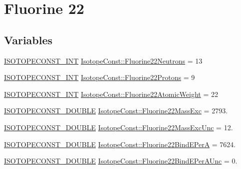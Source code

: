 \hypertarget{group___isotope_const-_fluorine-_f22}{}\section{Fluorine 22}
\label{group___isotope_const-_fluorine-_f22}
\subsection*{Variables}
\begin{DoxyCompactItemize}
\item 
\mbox{\hyperlink{group___isotope_const-_macros_ga5f18360b3e99483a35c32d789e62621c}{I\+S\+O\+T\+O\+P\+E\+C\+O\+N\+S\+T\+\_\+\+I\+NT}} \mbox{\hyperlink{group___isotope_const-_fluorine-_f22_gaa7f70ae2ba33cb16c14ec610ca5721f2}{Isotope\+Const\+::\+Fluorine22\+Neutrons}} = 13
\item 
\mbox{\hyperlink{group___isotope_const-_macros_ga5f18360b3e99483a35c32d789e62621c}{I\+S\+O\+T\+O\+P\+E\+C\+O\+N\+S\+T\+\_\+\+I\+NT}} \mbox{\hyperlink{group___isotope_const-_fluorine-_f22_ga9c431ed376681b993c250fc530d51812}{Isotope\+Const\+::\+Fluorine22\+Protons}} = 9
\item 
\mbox{\hyperlink{group___isotope_const-_macros_ga5f18360b3e99483a35c32d789e62621c}{I\+S\+O\+T\+O\+P\+E\+C\+O\+N\+S\+T\+\_\+\+I\+NT}} \mbox{\hyperlink{group___isotope_const-_fluorine-_f22_gaa260cbba53856e9680194eea66b7743d}{Isotope\+Const\+::\+Fluorine22\+Atomic\+Weight}} = 22
\item 
\mbox{\hyperlink{group___isotope_const-_macros_ga8f45a7272ce02c0b4c65c44636ed719a}{I\+S\+O\+T\+O\+P\+E\+C\+O\+N\+S\+T\+\_\+\+D\+O\+U\+B\+LE}} \mbox{\hyperlink{group___isotope_const-_fluorine-_f22_ga9c44402b3f2e461e75b4cad8fc5f6346}{Isotope\+Const\+::\+Fluorine22\+Mass\+Exc}} = 2793.
\item 
\mbox{\hyperlink{group___isotope_const-_macros_ga8f45a7272ce02c0b4c65c44636ed719a}{I\+S\+O\+T\+O\+P\+E\+C\+O\+N\+S\+T\+\_\+\+D\+O\+U\+B\+LE}} \mbox{\hyperlink{group___isotope_const-_fluorine-_f22_ga70ef43ecf8637c673132aebcbc64ba9c}{Isotope\+Const\+::\+Fluorine22\+Mass\+Exc\+Unc}} = 12.
\item 
\mbox{\hyperlink{group___isotope_const-_macros_ga8f45a7272ce02c0b4c65c44636ed719a}{I\+S\+O\+T\+O\+P\+E\+C\+O\+N\+S\+T\+\_\+\+D\+O\+U\+B\+LE}} \mbox{\hyperlink{group___isotope_const-_fluorine-_f22_ga2c4e3cd675e20a1f9101d8905895dd00}{Isotope\+Const\+::\+Fluorine22\+Bind\+E\+PerA}} = 7624.
\item 
\mbox{\hyperlink{group___isotope_const-_macros_ga8f45a7272ce02c0b4c65c44636ed719a}{I\+S\+O\+T\+O\+P\+E\+C\+O\+N\+S\+T\+\_\+\+D\+O\+U\+B\+LE}} \mbox{\hyperlink{group___isotope_const-_fluorine-_f22_gad897a47cb830d0fff50fd2ccecb2fbdf}{Isotope\+Const\+::\+Fluorine22\+Bind\+E\+Per\+A\+Unc}} = 0.

\end{DoxyCompactItemize}
